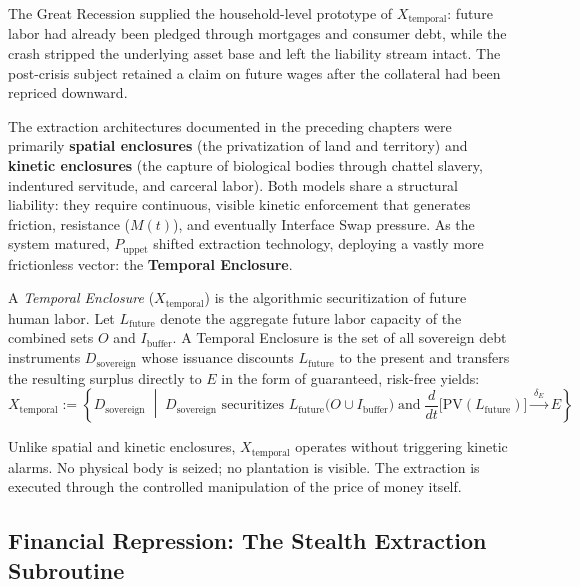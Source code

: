 The Great Recession supplied the household-level prototype of $X_{\text{temporal}}$: future labor had already been pledged through mortgages and consumer debt, while the crash stripped the underlying asset base and left the liability stream intact. The post-crisis subject retained a claim on future wages after the collateral had been repriced downward.

The extraction architectures documented in the preceding chapters were primarily \textbf{spatial enclosures} (the privatization of land and territory) and \textbf{kinetic enclosures} (the capture of biological bodies through chattel slavery, indentured servitude, and carceral labor). Both models share a structural liability: they require continuous, visible kinetic enforcement that generates friction, resistance ($M(t)$), and eventually Interface Swap pressure. As the system matured, $P_{\text{uppet}}$ shifted extraction technology, deploying a vastly more frictionless vector: the \textbf{Temporal Enclosure}.

\begin{definition}
A \textit{Temporal Enclosure} ($X_{\text{temporal}}$) is the algorithmic securitization of future human labor. Let $L_{\text{future}}$ denote the aggregate future labor capacity of the combined sets $O$ and $I_{\text{buffer}}$. A Temporal Enclosure is the set of all sovereign debt instruments $D_{\text{sovereign}}$ whose issuance discounts $L_{\text{future}}$ to the present and transfers the resulting surplus directly to $E$ in the form of guaranteed, risk-free yields:
\begin{equation}\label{eq:10.15-temporal-enclosure-definition}
X_{\text{temporal}} := \left\{ D_{\text{sovereign}} \;\middle|\; D_{\text{sovereign}} \text{ securitizes } L_{\text{future}}\bigl(O \cup I_{\text{buffer}}\bigr) \;\text{and}\; \frac{d}{dt}\bigl[\mathrm{PV}(L_{\text{future}})\bigr] \xrightarrow{\;\delta_E\;} E \right\}
\end{equation}
\end{definition}

\noindent Unlike spatial and kinetic enclosures, $X_{\text{temporal}}$ operates without triggering kinetic alarms. No physical body is seized; no plantation is visible. The extraction is executed through the controlled manipulation of the price of money itself.

\subsection*{Financial Repression: The Stealth Extraction Subroutine}

